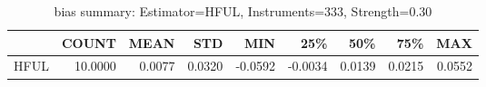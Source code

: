 \begin{table}[ht]
\centering
\caption{bias summary: Estimator=HFUL, Instruments=333, Strength=0.30}
\begin{tabular}{lrrrrrrrr}
\toprule
 & COUNT & MEAN & STD & MIN & 25\% & 50\% & 75\% & MAX \\
\midrule
HFUL & 10.0000 & 0.0077 & 0.0320 & -0.0592 & -0.0034 & 0.0139 & 0.0215 & 0.0552 \\
\bottomrule
\end{tabular}
\end{table}

